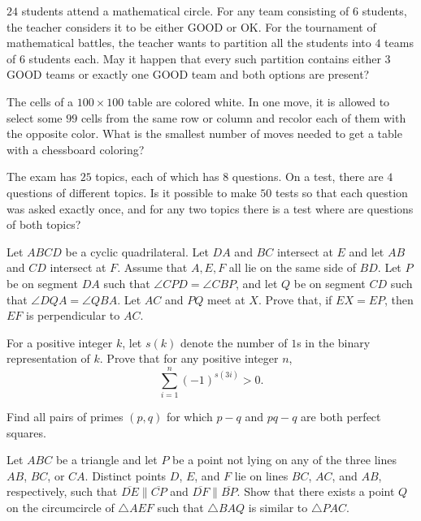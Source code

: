 \documentclass[11pt]{scrartcl}
\begin{document}
\begin{problem}[4415914581303660291]
$24$ students attend a mathematical circle. For any team consisting of $6$ students, the teacher considers it to be either GOOD or OK. For the tournament of mathematical battles, the teacher wants to partition all the students into $4$ teams of $6$ students each. May it happen that every such partition contains either $3$ GOOD teams or exactly one GOOD team and both options are present?
\end{problem}
\begin{problem}[685138775901874]
The cells of a $100 \times 100$ table are colored white. In one move, it is allowed to select some $99$ cells from the same row or column and recolor each of them with the opposite color. What is the smallest number of moves needed to get a table with a chessboard coloring?
\end{problem}
\begin{problem}[5101270312905584526]
The exam has $25$ topics, each of which has $8$ questions. On a test, there are $4$ questions of different topics.
Is it possible to make $50$ tests so that each question was asked exactly once, and for any two topics there is a test where are questions of both topics?
\end{problem}
\begin{problem}[3353450172272500341]
Let $ABCD$ be a cyclic quadrilateral. Let $DA$ and $BC$ intersect at $E$ and let $AB$ and $CD$
intersect at $F$. Assume that $A, E, F$ all lie on the same side of $BD$. Let $P$ be on segment $DA$
such that $\angle CPD = \angle CBP$, and let $Q$ be on segment $CD$ such that $\angle DQA = \angle QBA$. Let $AC$ and $PQ$ meet at $X$. Prove that, if $EX = EP$, then $EF$ is perpendicular to $AC$.
\end{problem}
\begin{problem}[402139377468684]
For a positive integer $k$, let $s(k)$ denote the number of $1$s in the binary representation of $k$. Prove that for any positive integer $n$,
\[\sum_{i=1}^{n}(-1)^{s(3i)} > 0.\]
\end{problem}
\begin{problem}[2302470517258475835]
	Find all pairs of primes $(p, q)$ for which $p-q$ and $pq-q$ are both perfect squares.
\end{problem}
\begin{problem}[7203789790519658258]
Let $ABC$ be a triangle and let $P$ be a point not lying on any of the three lines $AB$, $BC$, or $CA$. Distinct points $D$, $E$, and $F$ lie on lines $BC$, $AC$, and $AB$, respectively, such that $\overline{DE}\parallel \overline{CP}$ and $\overline{DF}\parallel \overline{BP}$. Show that there exists a point $Q$ on the circumcircle of $\triangle AEF$ such that $\triangle BAQ$ is similar to $\triangle PAC$.
\end{problem}
\end{document}
